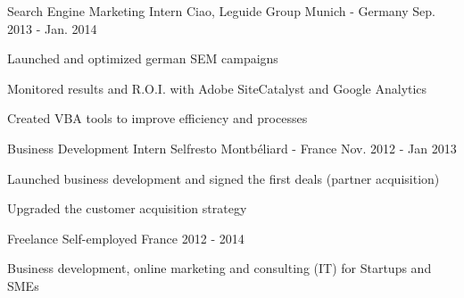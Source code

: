 \begin{cventries}
  \cventry
    {Search Engine Marketing Intern} %
    {Ciao, Leguide Group} %
    {Munich - Germany} %
    {Sep. 2013 - Jan. 2014} %
    {
      \begin{cvitems} %
        \item {Launched and optimized german SEM campaigns}
        \item {Monitored results and R.O.I. with Adobe SiteCatalyst and Google Analytics}
        \item {Created VBA tools to improve efficiency and processes}
      \end{cvitems}
    }
	\cventry
	{Business Development Intern} %
	{Selfresto} %
	{Montbéliard - France} %
	{Nov. 2012 - Jan 2013} %
	{
		\begin{cvitems} %
			\item {Launched business development and signed the first deals (partner acquisition)}
			\item {Upgraded the customer acquisition strategy}
		\end{cvitems}
	}
  \cventry
    {Freelance} %
    {Self-employed} %
    {France} %
    {2012 - 2014} %
    {	
      \begin{cvitems} %
      	\item{Business development, online marketing and consulting (IT) for Startups and SMEs}
      \end{cvitems}
    }




\end{cventries}
